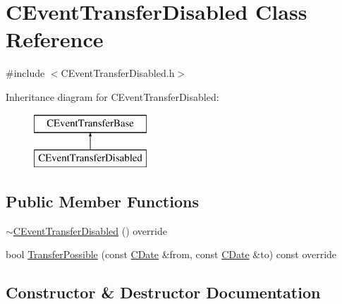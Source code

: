 \hypertarget{class_c_event_transfer_disabled}{}\section{C\+Event\+Transfer\+Disabled Class Reference}
\label{class_c_event_transfer_disabled}


{\ttfamily \#include $<$C\+Event\+Transfer\+Disabled.\+h$>$}

Inheritance diagram for C\+Event\+Transfer\+Disabled\+:\begin{figure}[H]
\begin{center}
\leavevmode
\includegraphics[height=2.000000cm]{class_c_event_transfer_disabled}
\end{center}
\end{figure}
\subsection*{Public Member Functions}
\begin{DoxyCompactItemize}
\item 
\mbox{\hyperlink{class_c_event_transfer_disabled_a3daa2c2c89449d98faeab6a57e57b8e7}{$\sim$\+C\+Event\+Transfer\+Disabled}} () override
\item 
bool \mbox{\hyperlink{class_c_event_transfer_disabled_a5015ce168c3fcba4a20381256f901c3a}{Transfer\+Possible}} (const \mbox{\hyperlink{class_c_date}{C\+Date}} \&from, const \mbox{\hyperlink{class_c_date}{C\+Date}} \&to) const override
\end{DoxyCompactItemize}


\subsection{Constructor \& Destructor Documentation}
\mbox{\label{class_c_event_transfer_disabled_a3daa2c2c89449d98faeab6a57e57b8e7}} 
